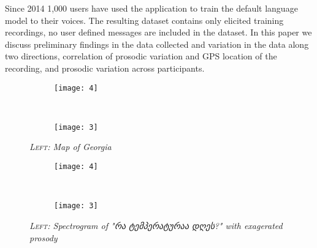 \documentclass[12pt]{amsart}
\begin{document}
Since 2014 1,000 users have used the application to train the default language
model to their voices. The resulting dataset contains only elicited training
recordings, no user defined messages are included in the dataset. In this paper
we discuss preliminary findings in the data collected and variation in the data
along two directions, correlation of prosodic variation and GPS location of the
recording, and prosodic variation across participants.


\newpage
\begin{figure}
    \centering
    \begin{subfigure}[b]{0.55\textwidth}
        \texttt{[image: 4]}
        \label{fig:mono}
    \end{subfigure}
    ~ %
    \begin{subfigure}[b]{0.45\textwidth}
        \texttt{[image: 3]}
        \label{fig:bil}
    \end{subfigure}
    \caption{\footnotesize{\textit{\textsc{Left:} Map of Georgia}}}\label{fig:map}
\end{figure}



\newpage
\begin{figure}
    \centering
    \begin{subfigure}[b]{0.55\textwidth}
        \texttt{[image: 4]}
        \label{fig:mono}
    \end{subfigure}
    ~ %
    \begin{subfigure}[b]{0.45\textwidth}
        \texttt{[image: 3]}
        \label{fig:bil}
    \end{subfigure}
    \caption{\footnotesize{\textit{\textsc{Left:} Spectrogram of "რა ტემპერატურაა დღეს?" with exagerated prosody}}}\label{fig:prosody1}
\end{figure}
\end{document}
